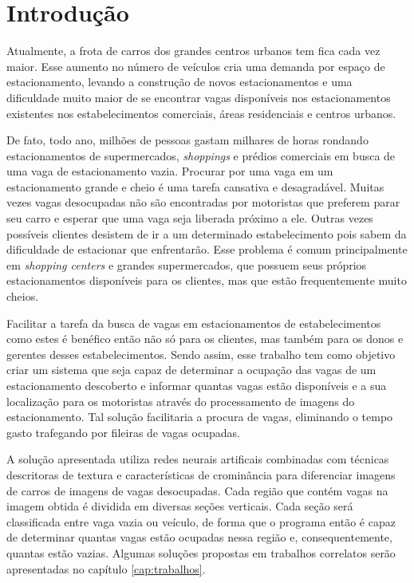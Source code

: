 \chapter{Introdução}\label{cap:intro}

			Atualmente, a frota de carros dos grandes centros urbanos tem fica cada vez maior. Esse aumento no número de veículos cria uma demanda por espaço de estacionamento, levando a construção de novos estacionamentos e uma dificuldade muito maior de se encontrar vagas disponíveis nos estacionamentos existentes nos estabelecimentos comerciais, áreas residenciais e centros urbanos.
			
			De fato, todo ano, milhões de pessoas gastam milhares de horas rondando estacionamentos de supermercados, \textit{shoppings} e prédios comerciais em busca de uma vaga de estacionamento vazia. Procurar por uma vaga em um estacionamento grande e cheio é uma tarefa cansativa e desagradável. Muitas vezes vagas desocupadas não são encontradas por motoristas que preferem parar seu carro e esperar que uma vaga seja liberada próximo a ele. Outras vezes possíveis clientes desistem de ir a um determinado estabelecimento pois sabem da dificuldade de estacionar que enfrentarão. Esse problema é comum principalmente em \textit{shopping centers} e grandes supermercados, que possuem seus próprios estacionamentos disponíveis para os clientes, mas que estão frequentemente muito cheios.
			
			Facilitar a tarefa da busca de vagas em estacionamentos de estabelecimentos como estes é benéfico então não só para os clientes, mas também para os donos e gerentes desses estabelecimentos. Sendo assim, esse trabalho tem como objetivo criar um sistema que seja capaz de determinar a ocupação das vagas de um estacionamento descoberto e informar quantas vagas estão disponíveis e a sua localização para os motoristas através do processamento de imagens do estacionamento. Tal solução facilitaria a procura de vagas, eliminando o tempo gasto trafegando por fileiras de vagas ocupadas.
			
			A solução apresentada utiliza redes neurais artificais combinadas com técnicas descritoras de textura e características de crominância para diferenciar imagens de carros de imagens de vagas desocupadas. Cada região que contém vagas na imagem obtida é dividida em diversas seções verticais. Cada seção será classificada entre vaga vazia ou veículo, de forma que o programa então é capaz de determinar quantas vagas estão ocupadas nessa região e, consequentemente, quantas estão vazias. Algumas soluções propostas em trabalhos correlatos serão apresentadas no capítulo \ref{cap:trabalhos}.
			
